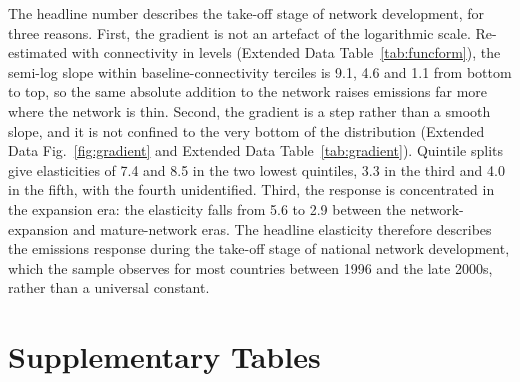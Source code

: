 \documentclass[12pt]{extarticle}
\begin{document}
The headline number describes the take-off stage of network development,
for three reasons. First, the gradient is not an artefact of the
logarithmic scale. Re-estimated with connectivity in levels (Extended
Data Table~\ref{tab:funcform}), the semi-log slope within
baseline-connectivity terciles is 9.1, 4.6 and 1.1 from bottom to top, so the same
absolute addition to the network raises emissions far more where the
network is thin. Second, the gradient is a step rather than a smooth
slope, and it is not confined to the very bottom of the distribution
(Extended Data Fig.~\ref{fig:gradient} and Extended Data
Table~\ref{tab:gradient}). Quintile splits give elasticities of 7.4 and
8.5 in the two lowest quintiles, 3.3 in the third and 4.0 in the fifth,
with the fourth unidentified. Third, the response is concentrated in the
expansion era: the elasticity falls from 5.6 to 2.9 between the
network-expansion and mature-network eras. The headline elasticity therefore describes
the emissions response during the take-off stage of national network
development, which the sample observes for most countries between 1996
and the late 2000s, rather than a universal constant.

\section*{Supplementary Tables}
\setcounter{table}{0}
\renewcommand{\tablename}{Supplementary Table}
\end{document}

